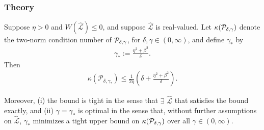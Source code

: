 \documentclass[blue]{beamer}
\begin{document}
%
\begin{frame}
\frametitle{Theory}

%
\begin{theorem}
Suppose $\eta > 0$ and $W(\widehat{\mathcal{L}}) \leq 0$,
and suppose $\widehat{\mathcal{L}}$ is real-valued.
Let $\kappa({\cal P}_{\delta, \gamma})$ denote the two-norm condition number of
${\cal P}_{\delta,\gamma}$, for $\delta, \gamma \in (0, \infty)$,
and define $\gamma_*$ by
\begin{align*}
\gamma_* := \frac{\eta^2+\beta^2}{\delta}.
\end{align*}
Then
\begin{align*}
\kappa(\mathcal{P}_{\delta, \gamma_*}) \leq \frac{1}{2 \eta} \left( \delta + \frac{\eta^2 + \beta^2}{\delta} \right).
\end{align*}

Moreover, (i) the bound is tight in the sense that $\exists$ $\widehat{\mathcal{L}}$
that satisfies the bound exactly, and (ii) $\gamma = \gamma_*$ is optimal
in the sense that, without further assumptions on $\widehat{\mathcal{L}}$, $\gamma_*$ minimizes a tight
upper bound on $\kappa({\cal P}_{\delta, \gamma})$ over all $\gamma \in (0, \infty)$.
\end{theorem}
%

\end{frame}
\end{document}
